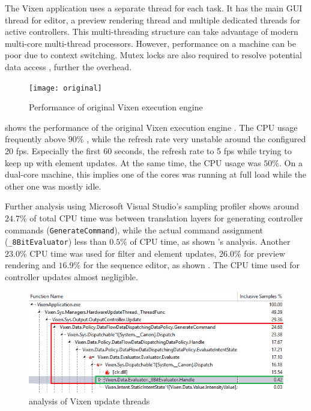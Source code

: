 The Vixen application uses a separate thread for each task. It has the main GUI thread for  editor, a preview rendering thread and multiple dedicated threads for active controllers. This multi-threading structure can take advantage of modern multi-core multi-thread processors. However, performance on a  machine can be poor due to context switching. Mutex locks are also required to resolve potential data access , further  the overhead.

\begin{figure}[!t]
  \centering
  \texttt{[image: original]}
  \caption{\footnotesize Performance of original Vixen execution engine}
  \label{fig:original}
\end{figure}

 shows the performance of the original Vixen execution engine . The CPU usage frequently  above $90 \%$ , while the refresh rate  very unstable around the configured 20 fps. Especially  the first 60 seconds, the refresh rate  to 5 fps while trying to keep up with element updates. At the same time, the CPU usage was  $50 \%$. On a dual-core machine, this implies one of the cores was running at full load while the other one was mostly idle.

Further analysis using Microsoft Visual Studio's sampling profiler shows around $24.7 \%$ of total CPU time was  between translation layers for generating controller commands (\texttt{GenerateCommand}), while the actual command assignment (\texttt{\_8BitEvaluator})  less than $0.5 \%$ of CPU time, as shown  's  analysis. Another $23.0 \%$  CPU time was used for filter and element updates, $26.0 \%$ for preview rendering and $16.9 \%$ for the sequence editor, as shown  . The CPU time used for controller updates  almost negligible.

\begin{figure}[!t]
  \centering
  \includegraphics[width=0.85\columnwidth]{Figs/vixen_perf_original.png}
  \caption{\footnotesize {} analysis of Vixen update threads}
  \label{fig:vixen_perf_original}
\end{figure}

